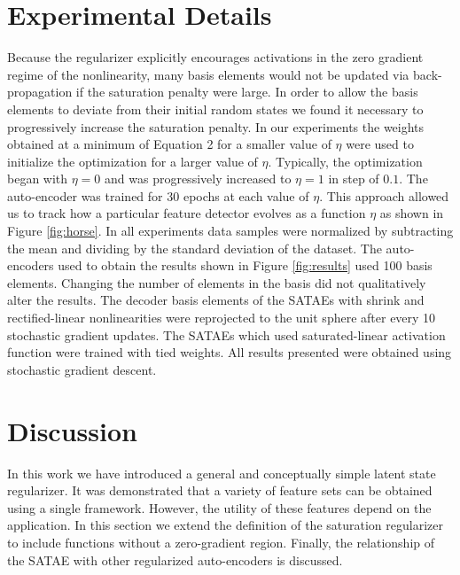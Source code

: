 \documentclass{article} %
\begin{document}
\section{Experimental Details}
Because the regularizer explicitly encourages activations in the zero gradient regime of the nonlinearity, many basis elements would not be updated via back-propagation if the saturation penalty were large. In order to allow the basis elements to deviate from their initial random states we found it necessary to progressively increase the saturation penalty. In our experiments the weights obtained at a minimum of Equation 2 for a smaller value of $\eta$ were used to initialize the optimization for a larger value of $\eta$. Typically, the optimization began with $\eta=0$ and was progressively increased to $\eta=1$ in step of $0.1$. The auto-encoder was trained for 30 epochs at each value of $\eta$. This approach allowed us to track how a particular feature detector evolves as a function $\eta$ as shown in Figure \ref{fig:horse}. In all experiments data samples were normalized by subtracting the mean and dividing by the standard deviation of the dataset. The auto-encoders used to obtain the results shown in Figure \ref{fig:results} used 100 basis elements. Changing the number of elements in the basis did not qualitatively alter the results. The decoder basis elements of the SATAEs with shrink and rectified-linear nonlinearities were reprojected to the unit sphere after every 10 stochastic gradient updates. The SATAEs which used saturated-linear activation function were trained with tied weights. All results presented were obtained using stochastic gradient descent.

\section{Discussion}

In this work we have introduced a general and conceptually simple latent state regularizer. It was demonstrated that a variety of feature sets can be obtained using a single framework. However, the utility of these features depend on the application. In this section we extend the definition of the saturation regularizer to include functions without a zero-gradient region. Finally, the relationship of the SATAE with other regularized auto-encoders is discussed. 
\end{document}
